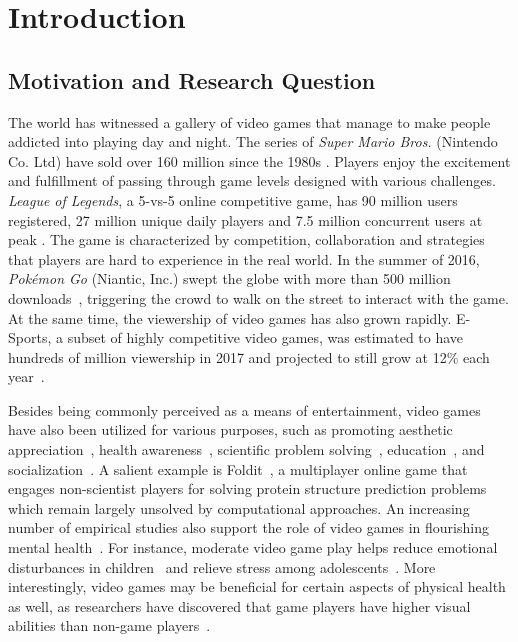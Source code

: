 
\chapter{Introduction} %

\label{chapter:intro} 

\section{Motivation and Research Question}\label{chap1:motiv}

The world has witnessed a gallery of video games that manage to make people addicted into playing day and night. The series of \textit{Super Mario Bros.} (Nintendo Co. Ltd) have sold over 160 million since the 1980s \cite{mariosale}. Players enjoy the excitement and fulfillment of passing through game levels designed with various challenges. \textit{League of Legends}, a 5-vs-5 online competitive game, has 90 million users registered, 27 million unique daily players and 7.5 million concurrent users at peak \cite{lol_fanbase,lol_27million}. The game is characterized by competition, collaboration and strategies that players are hard to experience in the real world. In the summer of 2016, \textit{Pok\'{e}mon Go} (Niantic, Inc.) swept the globe with more than 500 million downloads~\cite{pokemongo}, triggering the crowd to walk on the street to interact with the game. At the same time, the viewership of video games has also grown rapidly. E-Sports, a subset of highly competitive video games, was estimated to have hundreds of million viewership in 2017 and projected to still grow at 12\% each year~\cite{superdata2017}. 

Besides being commonly perceived as a means of entertainment, video games have also been utilized for various purposes, such as promoting aesthetic appreciation~\cite{jarvinen2008understanding}, health awareness~\cite{shiyko2016effects}, scientific problem solving~\cite{cooper2010predicting}, education~\cite{gee2003video}, and socialization~\cite{ferguson2013friends}. A salient example is Foldit~\cite{cooper2010predicting}, a multiplayer online game that engages non-scientist players for solving protein structure prediction problems which remain largely unsolved by computational approaches. An increasing number of empirical studies also support the role of video games in flourishing mental health~\cite{jones2014gaming}. For instance, moderate video game play helps reduce emotional disturbances in children~\cite{hull2009computer} and relieve stress among adolescents~\cite{colwell2007needs}. More interestingly, video games may be beneficial for certain aspects of physical health as well, as researchers have discovered that game players have higher visual abilities than non-game players~\cite{green2003action,li2009enhancing}.

